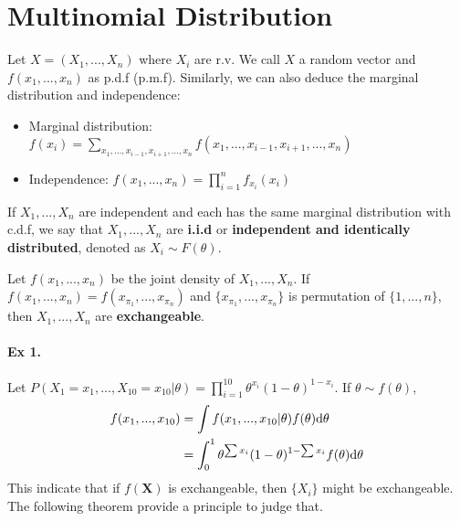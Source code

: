 \section{Multinomial Distribution}
	Let $X = (X_1,..., X_n)$ where $X_i$ are r.v. We call $X$ a random vector and $f(x_1,... ,x_n)$ as p.d.f (p.m.f). Similarly, we can also deduce the marginal distribution and independence:
	\begin{itemize}
		\item Marginal distribution: $f(x_i) = \sum\limits_{x_1,...,x_{i-1},x_{i+1},...,x_n}f(x_1,...,x_{i-1},x_{i+1},...,x_n)$
		\item Independence: $f(x_1, ..., x_n) = \prod\limits_{i=1}^{n}f_{x_i}(x_i)$
	\end{itemize}
	\begin{definition}[iid]
		If $X_1, ..., X_n$ are independent and each has the same marginal distribution with c.d.f, we say that $X_1, ...,X_n$ are \textbf{i.i.d} or \textbf{independent and identically distributed}, denoted as $X_i \sim F(\theta)$.
	\end{definition}

	\begin{definition}[exchangeable]
		Let $f(x_1, ..., x_n)$ be the joint density of $X_1, ..., X_n$. If $f(x_1 ,..., x_n) = f(x_{\pi_1},...,x_{\pi_n})$ and $\{x_{\pi_1},...,x_{\pi_n}\}$ is permutation of $\{1,...,n\}$, then $X_1, ...,X_n$ are \textbf{exchangeable}.
	\end{definition}

	\paragraph{Ex 1.}
	Let $P(X_1=x_1, ...,X_{10}=x_{10}|\theta) = \prod\limits_{i=1}^{10}\theta^{x_i}(1-\theta)^{1-x_i}$. If $\theta \sim f(\theta)$,
		\begin{align*}
			f(x_1, ..., x_{10})& = \int f(x_1,..., x_{10}|\theta)f(\theta)\mathrm{d} \theta\\
			& = \int_{0}^{1}\theta^{\sum x_i}(1-\theta)^{1-\sum x_i}f(\theta)\mathrm{d} \theta
		\end{align*}
	This indicate that if $f(\textbf{X})$ is exchangeable, then $\{X_i\}$ might be exchangeable. The following theorem provide a principle to judge that.
	
